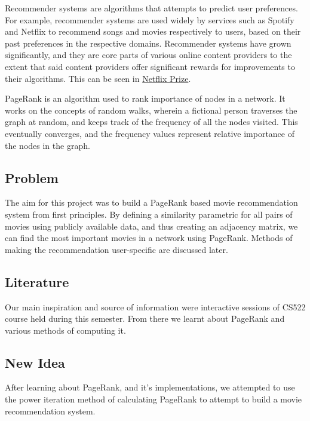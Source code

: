 \documentclass[11pt]{article}
\begin{document}
Recommender systems are algorithms that attempts to predict user
preferences. For example, recommender systems are used widely by
services such as Spotify and Netflix to recommend songs and movies
respectively to users, based on their past preferences in the respective
domains. Recommender systems have grown significantly, and they are core
parts of various online content providers to the extent that said
content providers offer significant rewards for improvements to their
algorithms. This can be seen in
\href{https://www.kaggle.com/netflix-inc/netflix-prize-data}{Netflix
Prize}.

PageRank is an algorithm used to rank importance of nodes in a network.
It works on the concepts of random walks, wherein a fictional person
traverses the graph at random, and keeps track of the frequency of all
the nodes visited. This eventually converges, and the frequency values
represent relative importance of the nodes in the graph.

\hypertarget{problem}{%
\subsection{Problem}\label{problem}}

The aim for this project was to build a PageRank based movie
recommendation system from first principles. By defining a similarity
parametric for all pairs of movies using publicly available data, and
thus creating an adjacency matrix, we can find the most important movies
in a network using PageRank. Methods of making the recommendation
user-specific are discussed later.

\hypertarget{literature}{%
\subsection{Literature}\label{literature}}

Our main inspiration and source of information were interactive sessions
of CS522 course held during this semester. From there we learnt about
PageRank and various methods of computing it.

\hypertarget{new-idea}{%
\subsection{New Idea}\label{new-idea}}

After learning about PageRank, and it's implementations, we attempted to
use the power iteration method of calculating PageRank to attempt to
build a movie recommendation system.
\end{document}
